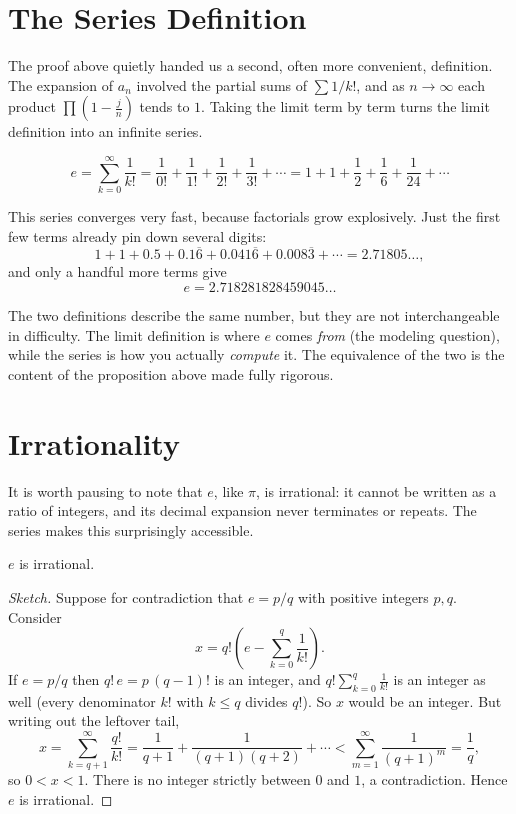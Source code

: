 \documentclass{essay}
\begin{document}
\section{The Series Definition}

The proof above quietly handed us a second, often more convenient, definition. The expansion of $a_n$ involved the partial sums of $\sum 1/k!$, and as $n \to \infty$ each product $\prod\left(1 - \tfrac{j}{n}\right)$ tends to $1$. Taking the limit term by term turns the limit definition into an infinite series.

\begin{definition}
  \[
    e = \sum_{k=0}^{\infty} \frac{1}{k!}
    = \frac{1}{0!} + \frac{1}{1!} + \frac{1}{2!} + \frac{1}{3!} + \cdots
    = 1 + 1 + \frac{1}{2} + \frac{1}{6} + \frac{1}{24} + \cdots
  \]
\end{definition}

This series converges very fast, because factorials grow explosively. Just the first few terms already pin down several digits:
\[
  1 + 1 + 0.5 + 0.1\overline{6} + 0.041\overline{6} + 0.008\overline{3} + \cdots = 2.71805\ldots,
\]
and only a handful more terms give
\[
  e = 2.718281828459045\ldots
\]

The two definitions describe the same number, but they are not interchangeable in difficulty. The limit definition is where $e$ comes \emph{from} (the modeling question), while the series is how you actually \emph{compute} it. The equivalence of the two is the content of the proposition above made fully rigorous.

\section{Irrationality}

It is worth pausing to note that $e$, like $\pi$, is irrational: it cannot be written as a ratio of integers, and its decimal expansion never terminates or repeats. The series makes this surprisingly accessible.

\begin{theorem}
  $e$ is irrational.
\end{theorem}

\begin{proof}[Sketch]
  Suppose for contradiction that $e = p/q$ with positive integers $p, q$. Consider
  \[
    x = q!\left(e - \sum_{k=0}^{q}\frac{1}{k!}\right).
  \]
  If $e = p/q$ then $q!\,e = p\,(q-1)!$ is an integer, and $q!\sum_{k=0}^{q}\tfrac{1}{k!}$ is an integer as well (every denominator $k!$ with $k \le q$ divides $q!$). So $x$ would be an integer. But writing out the leftover tail,
  \[
    x = \sum_{k=q+1}^{\infty}\frac{q!}{k!}
    = \frac{1}{q+1} + \frac{1}{(q+1)(q+2)} + \cdots
    < \sum_{m=1}^{\infty}\frac{1}{(q+1)^m}
    = \frac{1}{q},
  \]
  so $0 < x < 1$. There is no integer strictly between $0$ and $1$, a contradiction. Hence $e$ is irrational.
\end{proof}
\end{document}
